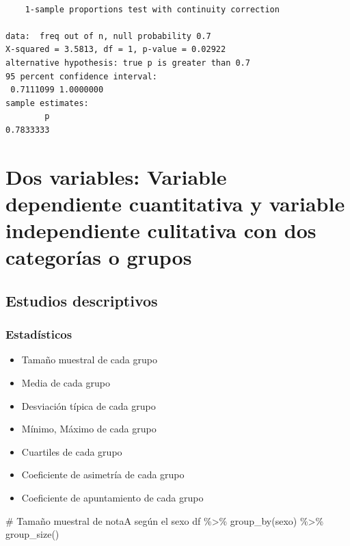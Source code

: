 \documentclass[
  spanish,
  a4paper,
]{scrreport}
\newenvironment{Shaded}{\begin{snugshade}}{\end{snugshade}}
\newcommand{\CommentTok}[1]{\textcolor[rgb]{0.37,0.37,0.37}{#1}}
\newcommand{\FunctionTok}[1]{\textcolor[rgb]{0.28,0.35,0.67}{#1}}
\newcommand{\NormalTok}[1]{\textcolor[rgb]{0.00,0.23,0.31}{#1}}
\newcommand{\SpecialCharTok}[1]{\textcolor[rgb]{0.37,0.37,0.37}{#1}}
\providecommand{\tightlist}{%
  \setlength{\itemsep}{0pt}\setlength{\parskip}{0pt}}
\theoremstyle{definition}
\theoremstyle{definition}
\theoremstyle{remark}
\begin{document}
\begin{verbatim}

    1-sample proportions test with continuity correction

data:  freq out of n, null probability 0.7
X-squared = 3.5813, df = 1, p-value = 0.02922
alternative hypothesis: true p is greater than 0.7
95 percent confidence interval:
 0.7111099 1.0000000
sample estimates:
        p 
0.7833333 
\end{verbatim}

\section{Dos variables: Variable dependiente cuantitativa y variable
independiente culitativa con dos categorías o
grupos}\label{dos-variables-variable-dependiente-cuantitativa-y-variable-independiente-culitativa-con-dos-categoruxedas-o-grupos}

\subsection{Estudios descriptivos}\label{estudios-descriptivos-2}

\subsubsection{Estadísticos}\label{estaduxedsticos-2}

\begin{itemize}
\tightlist
\item
  Tamaño muestral de cada grupo
\item
  Media de cada grupo
\item
  Desviación típica de cada grupo
\item
  Mínimo, Máximo de cada grupo
\item
  Cuartiles de cada grupo
\item
  Coeficiente de asimetría de cada grupo
\item
  Coeficiente de apuntamiento de cada grupo
\end{itemize}

\begin{Shaded}
\begin{Highlighting}[]
\CommentTok{\# Tamaño muestral de notaA según el sexo}
\NormalTok{df }\SpecialCharTok{\%\textgreater{}\%} \FunctionTok{group\_by}\NormalTok{(sexo) }\SpecialCharTok{\%\textgreater{}\%} \FunctionTok{group\_size}\NormalTok{()}
\end{Highlighting}
\end{Shaded}
\end{document}
